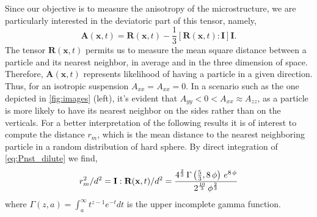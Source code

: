Since our objective is to measure the anisotropy of the microstructure, we are particularly interested in the deviatoric part of this tensor, namely,
\begin{equation*}
    \textbf{A}(\textbf{x},t) = \textbf{R}(\textbf{x},t) - \frac{1}{3} [\textbf{R}(\textbf{x},t) : \textbf{I}] \textbf{I}.
\end{equation*}
The tensor $\textbf{R}(\textbf{x},t)$ permits us to measure the mean square distance between a particle and its nearest neighbor, in average and in the three dimension of space. 
Therefore, $\textbf{A}(\textbf{x},t)$ represents likelihood of having a particle in a given direction. 
Thus, for an isotropic suspension $A_{xx} = A_{xx} = 0$. 
In a scenario such as the one depicted in \ref{fig:images} (left), it's evident that $A_{yy} < 0 < A_{xx} \approx A_{zz}$, as a particle is more likely to have its nearest neighbor on the sides rather than on the verticals.
For a better interpretation of the following results it is of interest to compute the distance $r_m$, which is the mean distance to the nearest neighboring particle in a random distribution of hard sphere. 
By direct integration of \ref{eq:Pnst_dilute} we find, 
\begin{equation*}
    r_m^2 /d^2
    = \textbf{I}:\textbf{R}(\textbf{x},t)/d^2
    = {{4^{{{2}\over{3}}}\,\Gamma\left({{5}\over{3}} , 8\,\phi\right)
    \,e^{8\,\phi}}\over{2^{{{10}\over{3}}}\,\phi^{{{2}\over{3}}}}}
\end{equation*}
where $\Gamma(z,a) = \int_a^\infty t^{z-1} e^{-t} dt$ is the upper incomplete gamma function. 

